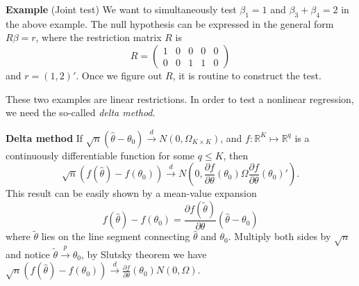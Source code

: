 \documentclass[11pt]{article}
\renewcommand{\hat}{\widehat}
\begin{document}
\textbf{Example} (Joint test) We want to simultaneously test
\(\beta_{1}=1\) and \(\beta_{3}+\beta_{4}=2\) in the above example. The
null hypothesis can be expressed in the general form \(R\beta=r\), where
the restriction matrix \(R\) is \[R=\begin{pmatrix}1 & 0 & 0 & 0 & 0\\
0 & 0 & 1 & 1 & 0
\end{pmatrix}\] and \(r=\left(1,2\right)'\). Once we figure out \(R\),
it is routine to construct the test.

    These two examples are linear restrictions. In order to test a nonlinear
regression, we need the so-called \emph{delta method}.

\textbf{Delta method} If
\(\sqrt{n}\left(\widehat{\theta}-\theta_{0}\right)\stackrel{d}{\to}N\left(0,\Omega_{K\times K}\right)\),
and \(f:\mathbb{R}^{K}\mapsto\mathbb{R}^{q}\) is a continuously
differentiable function for some \(q\leq K\), then
\[\sqrt{n}\left(f\left(\widehat{\theta}\right)-f\left(\theta_{0}\right)\right)\stackrel{d}{\to}N\left(0,\frac{\partial f}{\partial\theta}\left(\theta_{0}\right)\Omega\frac{\partial f}{\partial\theta}\left(\theta_{0}\right)'\right).\]
This result can be easily shown by a mean-value expansion
\[
f(\hat{\theta} ) - f(\theta_0) = \frac{ \partial f(\tilde{\theta}) }{\partial \theta} 
(\hat{\theta} - \theta_0)
\]
where $\tilde{\theta}$ lies on the line segment connecting $\hat{\theta}$ and $\theta_0$.
Multiply both sides by $\sqrt{n}$ and notice $\tilde{\theta} \stackrel{p}{\to} \theta_0$,
by Slutsky theorem we have 
$\sqrt{n} (f(\hat{\theta} ) - f(\theta_0) ) \stackrel{d}{\to}
\frac{\partial f}{\partial\theta}\left(\theta_{0}\right) N(0,\Omega).
 $
\end{document}
